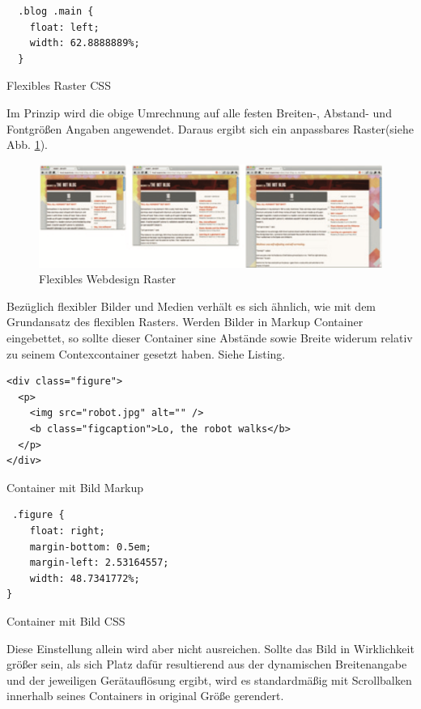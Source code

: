 \begin{listing}[H]
\begin{verbatim}
  .blog .main {
    float: left;
    width: 62.8888889%;
  }
\end{verbatim}
\caption{Flexibles Raster CSS}
\label{lst:flex_grid_css}
\end{listing}

Im Prinzip wird die obige Umrechnung auf alle festen Breiten-, Abstand- und Fontgrößen Angaben angewendet. Daraus ergibt sich ein anpassbares Raster(siehe Abb. \ref{fig:flex_grid}).

\begin{figure}[htp]     %
\centering
\includegraphics[width=1.0\textwidth]{images/flex_grid} 
\caption{Flexibles Webdesign Raster}\label{fig:flex_grid}
\end{figure}

Bezüglich flexibler Bilder und Medien verhält es sich ähnlich, wie mit dem Grundansatz des flexiblen Rasters. Werden Bilder in Markup Container eingebettet, so sollte dieser Container sine Abstände sowie Breite widerum relativ zu seinem Contexcontainer gesetzt haben. Siehe Listing. 

\begin{listing}[H]
\begin{verbatim}
<div class="figure">
  <p>
    <img src="robot.jpg" alt="" />
    <b class="figcaption">Lo, the robot walks</b>
  </p>
</div>
\end{verbatim}
\caption{Container mit Bild Markup}
\label{lst:image_container_markup}
\end{listing}
 
\begin{listing}[H]
\begin{verbatim}
 .figure {
    float: right;
    margin-bottom: 0.5em;
    margin-left: 2.53164557;
    width: 48.7341772%;
}
\end{verbatim}
\caption{Container mit Bild CSS}
\label{lst:image_container_css}
\end{listing}

Diese Einstellung allein wird aber nicht ausreichen. Sollte das Bild in Wirklichkeit größer sein, als sich Platz dafür resultierend aus der dynamischen Breitenangabe und der jeweiligen Gerätauflösung ergibt, wird es standardmäßig mit Scrollbalken innerhalb seines Containers in original Größe gerendert.

